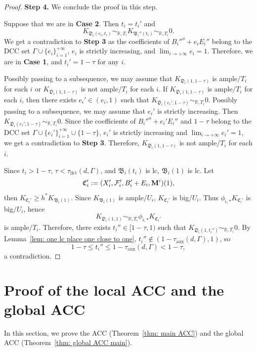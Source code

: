 \documentclass[11pt,reqno]{amsart}
\numberwithin{equation}{section}
\newcommand{\Mm}{{\bf{M}}}
\newcommand{\Dd}{{\mathfrak{D}}}
\newcommand{\Cc}{\mathfrak{C}}
\newcommand{\ilct}{\operatorname{ilct}}
\newcommand{\aux}{\operatorname{aux}}
\newcommand{\Bb}{{\mathfrak{B}}}
\newcommand{\Ff}{\mathcal{F}}
\newcommand{\Ii}{\Gamma}
\theoremstyle{definition}
\begin{document}
\begin{proof}
\medskip

\noindent\textbf{Step 4.} We conclude the proof in this step. 

Suppose that we are in \textbf{Case 2}. Then $t_i=t_i'$ and $$K_{\Dd_i(e_i,t_i)}\sim_{\mathbb R,T_i}K_{\Bb_i''(t_i)}\sim_{\mathbb R,T_i}0.$$ 
We get a contradiction to \textbf{Step 3} as the coefficients of $B_i''^o+e_iE_i''$ 
belong to the DCC set $\Ii\cup\{e_i\}_{i=1}^{+\infty}$, $e_i$ is strictly increasing, and $\lim_{i\rightarrow+\infty}e_i=1$. Therefore, we are in \textbf{Case 1}, and $t_i'=1-\tau$ for any $i$. 

Possibly passing to a subsequence, we may assume that $K_{\Dd_i(1,1-\tau)}$ is ample$/T_i$ for each $i$ or $K_{\Dd_i(1,1-\tau)}$ is not ample$/T_i$ for each $i$. If $K_{\Dd_i(1,1-\tau)}$ is ample$/T_i$ for each $i$, then there exists $e_i'\in (e_i,1)$ such that $K_{\Dd_i(e_i',1-\tau)}\sim_{\mathbb R,T_i}0$. Possibly passing to a subsequence, we may assume that $e_i'$ is strictly increasing. Then $K_{\Dd_i(e_i',1-\tau)}\sim_{\mathbb R,T_i}0$. Since the coefficients of $B_i''^o+e_i'E_i''$ and $1-\tau$ belong to the DCC set $\Ii\cup\{e_i'\}_{i=1}^{+\infty}\cup\{1-\tau\}$, $e_i'$ is strictly increasing and $\lim_{i\rightarrow+\infty}e_i'=1$, we get a contradiction to \textbf{Step 3}. Therefore, $K_{\Dd_i(1,1-\tau)}$ is not ample$/T_i$ for each $i$. 

Since $t_i>1-\tau$, $\tau<\tau_{\ilct}(d,\Ii)$, and $\Bb_i(t_i)$ is lc, $\Bb_i(1)$ is lc. Let
$$\Cc_i':=(X_i',\Ff_i',B_i'+E_i,\Mm^i)(1),$$
then $K_{\Cc_i'}\geq h^*K_{\Bb_i(1)}$. Since $K_{\Bb_i(1)}$ is ample$/U_i$, $K_{\Cc_i'}$ is big$/U_i$. Thus $\phi_{i,*}K_{\Cc_i'}$ is big$/U_i$, hence
$$K_{\Dd_i(1,1)}\sim_{\mathbb R,T_i}\phi_{i,*}K_{\Cc_i'}$$
is ample$/T_i$. Therefore, there exists $t_i''\in [1-\tau,1)$ such that $K_{\Dd_i(1,t_i'')}\sim_{\mathbb R,T_i}0$. By Lemma~\ref{lem: one lc place one close to one}, $t_i''\not\in (1-\tau_{\aux}(d,\Ii),1)$, so
$$1-\tau\leq t_i''\leq 1-\tau_{\aux}(d,\Ii)<1-\tau,$$
a contradiction.
\end{proof}

\section{Proof of the local ACC and the global ACC}\label{sec: proof of acc and global acc}

In this section, we prove the ACC (Theorem~\ref{thm: main ACC}) and the global ACC (Theorem~\ref{thm: global ACC main}).
\end{document}
